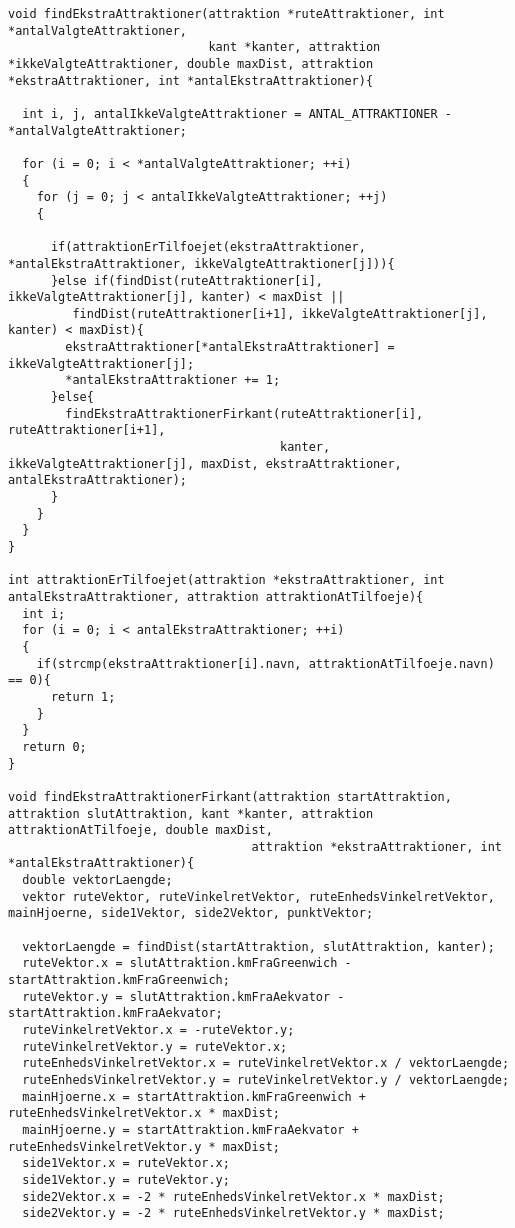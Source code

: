 \begin{lstlisting}
void findEkstraAttraktioner(attraktion *ruteAttraktioner, int *antalValgteAttraktioner, 
                            kant *kanter, attraktion *ikkeValgteAttraktioner, double maxDist, attraktion *ekstraAttraktioner, int *antalEkstraAttraktioner){

  int i, j, antalIkkeValgteAttraktioner = ANTAL_ATTRAKTIONER - *antalValgteAttraktioner;

  for (i = 0; i < *antalValgteAttraktioner; ++i)
  {
    for (j = 0; j < antalIkkeValgteAttraktioner; ++j)
    {

      if(attraktionErTilfoejet(ekstraAttraktioner, *antalEkstraAttraktioner, ikkeValgteAttraktioner[j])){
      }else if(findDist(ruteAttraktioner[i], ikkeValgteAttraktioner[j], kanter) < maxDist || 
         findDist(ruteAttraktioner[i+1], ikkeValgteAttraktioner[j], kanter) < maxDist){
        ekstraAttraktioner[*antalEkstraAttraktioner] = ikkeValgteAttraktioner[j];
        *antalEkstraAttraktioner += 1;
      }else{
        findEkstraAttraktionerFirkant(ruteAttraktioner[i], ruteAttraktioner[i+1], 
                                      kanter, ikkeValgteAttraktioner[j], maxDist, ekstraAttraktioner, antalEkstraAttraktioner);
      }
    }
  }
}

int attraktionErTilfoejet(attraktion *ekstraAttraktioner, int antalEkstraAttraktioner, attraktion attraktionAtTilfoeje){
  int i;
  for (i = 0; i < antalEkstraAttraktioner; ++i)
  {
    if(strcmp(ekstraAttraktioner[i].navn, attraktionAtTilfoeje.navn) == 0){
      return 1;
    }
  }
  return 0;
}

void findEkstraAttraktionerFirkant(attraktion startAttraktion, attraktion slutAttraktion, kant *kanter, attraktion attraktionAtTilfoeje, double maxDist, 
                                  attraktion *ekstraAttraktioner, int *antalEkstraAttraktioner){
  double vektorLaengde;
  vektor ruteVektor, ruteVinkelretVektor, ruteEnhedsVinkelretVektor, mainHjoerne, side1Vektor, side2Vektor, punktVektor;

  vektorLaengde = findDist(startAttraktion, slutAttraktion, kanter);
  ruteVektor.x = slutAttraktion.kmFraGreenwich - startAttraktion.kmFraGreenwich;
  ruteVektor.y = slutAttraktion.kmFraAekvator - startAttraktion.kmFraAekvator;
  ruteVinkelretVektor.x = -ruteVektor.y;
  ruteVinkelretVektor.y = ruteVektor.x;
  ruteEnhedsVinkelretVektor.x = ruteVinkelretVektor.x / vektorLaengde;
  ruteEnhedsVinkelretVektor.y = ruteVinkelretVektor.y / vektorLaengde;
  mainHjoerne.x = startAttraktion.kmFraGreenwich + ruteEnhedsVinkelretVektor.x * maxDist;
  mainHjoerne.y = startAttraktion.kmFraAekvator + ruteEnhedsVinkelretVektor.y * maxDist;
  side1Vektor.x = ruteVektor.x;
  side1Vektor.y = ruteVektor.y;
  side2Vektor.x = -2 * ruteEnhedsVinkelretVektor.x * maxDist;
  side2Vektor.y = -2 * ruteEnhedsVinkelretVektor.y * maxDist;


\end{lstlisting}
